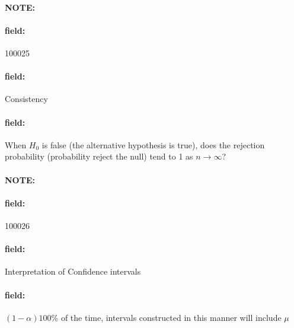 \documentclass[12pt]{article}
\newenvironment{note}{\paragraph{NOTE:}}{}
\newenvironment{field}{\paragraph{field:}}{}
\begin{document}
\begin{note} \begin{field} \tiny 100025 \end{field}
 \begin{field}
  Consistency
 \end{field}
 \begin{field}
  When $H_0$ is false (the alternative hypothesis is true), does the rejection probability (probability reject the null) tend to 1 as $n \to \infty$?
 \end{field}
\end{note}

\begin{note} \begin{field} \tiny 100026 \end{field}
 \begin{field}
  Interpretation of Confidence intervals
 \end{field}
 \begin{field}
  $(1 - \alpha)100$\% of the time, intervals constructed in this manner will include $\mu$
 \end{field}
\end{note}
\end{document}
